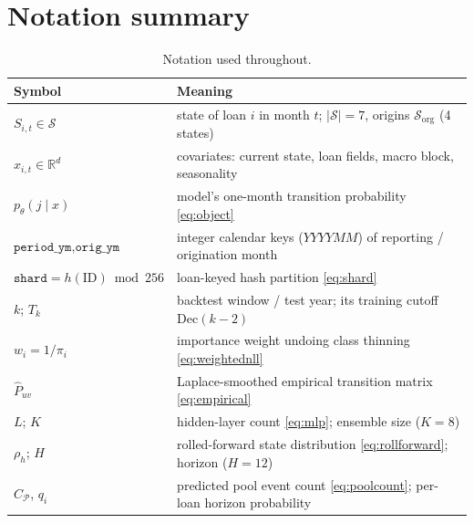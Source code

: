 \documentclass[11pt,a4paper]{article}
\newcommand{\R}{\mathbb{R}}
\newcommand{\code}[1]{\texttt{#1}}
\begin{document}
\section{Notation summary}\label{app:notation}

\begin{table}[h]
\centering\small
\begin{tabular}{ll}
\toprule
Symbol & Meaning \\
\midrule
$S_{i,t}\in\mathcal{S}$ & state of loan $i$ in month $t$; $|\mathcal{S}|=7$, origins $\mathcal{S}_{\mathrm{org}}$ (4 states) \\
$x_{i,t}\in\R^d$ & covariates: current state, loan fields, macro block, seasonality \\
$p_\theta(j\mid x)$ & model's one-month transition probability \eqref{eq:object} \\
$\code{period\_ym}, \code{orig\_ym}$ & integer calendar keys ($YYYYMM$) of reporting / origination month \\
$\code{shard} = h(\mathrm{ID}) \bmod 256$ & loan-keyed hash partition \eqref{eq:shard} \\
$k$; $T_k$ & backtest window / test year; its training cutoff $\mathrm{Dec}(k{-}2)$ \\
$w_i = 1/\pi_i$ & importance weight undoing class thinning \eqref{eq:weightednll} \\
$\widehat P_{uv}$ & Laplace-smoothed empirical transition matrix \eqref{eq:empirical} \\
$L$; $K$ & hidden-layer count \eqref{eq:mlp}; ensemble size ($K=8$) \\
$\rho_h$; $H$ & rolled-forward state distribution \eqref{eq:rollforward}; horizon ($H=12$) \\
$\widehat{C}_{\mathcal{P}}$, $q_i$ & predicted pool event count \eqref{eq:poolcount}; per-loan horizon probability \\
\bottomrule
\end{tabular}
\caption{Notation used throughout.}
\end{table}
\end{document}
